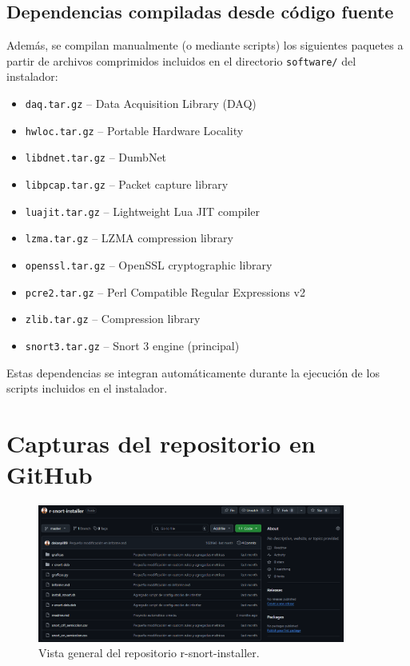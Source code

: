 \documentclass[11pt,a4paper,twoside]{report}
\begin{document}
\pagebreak

\subsection*{Dependencias compiladas desde código fuente}
Además, se compilan manualmente (o mediante scripts) los siguientes paquetes a partir de archivos comprimidos incluidos en el directorio \texttt{software/} del instalador:

\begin{itemize}
	\item \texttt{daq.tar.gz} – Data Acquisition Library (DAQ)
	\item \texttt{hwloc.tar.gz} – Portable Hardware Locality
	\item \texttt{libdnet.tar.gz} – DumbNet
	\item \texttt{libpcap.tar.gz} – Packet capture library
	\item \texttt{luajit.tar.gz} – Lightweight Lua JIT compiler
	\item \texttt{lzma.tar.gz} – LZMA compression library
	\item \texttt{openssl.tar.gz} – OpenSSL cryptographic library
	\item \texttt{pcre2.tar.gz} – Perl Compatible Regular Expressions v2
	\item \texttt{zlib.tar.gz} – Compression library
	\item \texttt{snort3.tar.gz} – Snort 3 engine (principal)
\end{itemize}

Estas dependencias se integran automáticamente durante la ejecución de los scripts incluidos en el instalador.

\section*{Capturas del repositorio en GitHub}

\begin{figure}[H]
	\centering
	\includegraphics[width=0.9\textwidth]{github/1.png}
	\caption{Vista general del repositorio r-snort-installer.}
\end{figure}
\end{document}
